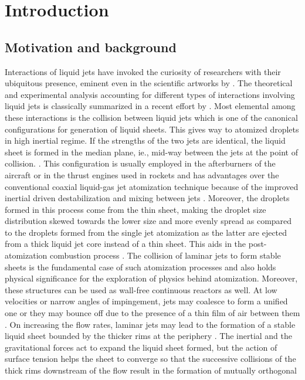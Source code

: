 \newcommand{\keyword}[1]{\textbf{#1}}
\newcommand{\tabhead}[1]{\textbf{#1}}
\newcommand{\code}[1]{\texttt{#1}}
\newcommand{\file}[1]{\texttt{\bfseries#1}}
\newcommand{\option}[1]{\texttt{\itshape#1}}
\chapter{Introduction}
\lipsum[1]
\section{Motivation and background}
Interactions of liquid jets have invoked the curiosity of researchers with their ubiquitous presence, eminent even in the scientific artworks by \cite{da1954notebooks}. The theoretical and experimental analysis accounting for different types of interactions involving liquid jets is classically summarized in a recent effort by \cite{eggers2008physics}. Most elemental among these interactions is the collision between liquid jets which is one of the canonical configurations for generation of liquid sheets. This gives way to atomized droplets in high inertial regime. If the strengths of the two jets are identical, the liquid sheet is formed in the median plane, ie., mid-way between the jets at the point of collision.  \citep{bush2004collision}. This configuration is usually employed in the afterburners of the aircraft or in the thrust engines used in rockets \citep{chen2013high} and has advantages over the conventional coaxial liquid-gas jet atomization technique because of the improved inertial driven destabilization and mixing between jets \citep{erni2013free}. Moreover, the droplets formed in this process come from the thin sheet, making the droplet size distribution skewed towards the lower size and more evenly spread \citep{inoue2008study,inoue2009liquid} as compared to the droplets formed from the single jet atomization as the latter are ejected from a thick liquid jet core instead of a thin sheet. This aids in the post-atomization combustion process \citep{lhuissier2011destabilization}. The collision of laminar jets to form stable sheets is the fundamental case of such atomization processes and also holds physical significance for the exploration of physics behind atomization. Moreover, these structures can be used as wall-free continuous reactors \citep{erni2013free} as well. At low velocities or narrow angles of impingement, jets may coalesce to form a unified one or they may bounce off due to the presence of a thin film of air between them \citep{wadhwa2013noncoalescence}. On increasing the flow rates, laminar jets may lead to the formation of a stable liquid sheet bounded by the thicker rims at the periphery \citep{yang2014liquid}. The inertial and the gravitational forces act to expand the liquid sheet formed, but the action of surface tension helps the sheet to converge so that the successive collisions of the thick rims downstream of the flow result in the formation of mutually orthogonal 
